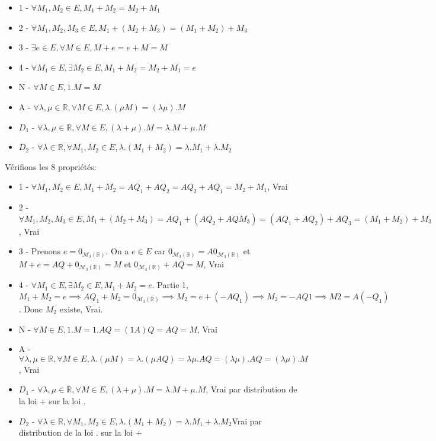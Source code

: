 \documentclass[]{book}
\theoremstyle{definition}
\newcommand{\bb}[1]{\mathbb{#1}}
\newcommand{\R}{\bb{R}}
\begin{document}
\begin{itemize}
\item 1 - $\forall M_1, M_2 \in E, M_1 + M_2 = M_2 + M_1$
\item 2 - $\forall M_1, M_2,M_3 \in E, M_1 + (M_2 + M_3)= (M_1 + M_2) + M_3$
\item 3 - $\exists e \in E, \forall M \in E, M+e=e+M=M$
\item 4 - $\forall M_1 \in E,\exists M_2 \in E, M_1 + M_2 = M_2 + M_1 = e$
\item N - $\forall M \in E, 1.M = M$
\item A - $\forall \lambda, \mu \in \R, \forall M \in E, \lambda.(\mu M) = (\lambda \mu).M$
\item $D_1$ - $\forall \lambda, \mu \in \R, \forall M \in E, (\lambda + \mu).M = \lambda.M + \mu.M$
\item $D_2$ - $\forall \lambda \in \R, \forall M_1, M_2 \in E, \lambda.(M_1+M_2) = \lambda.M_1 + \lambda.M_2$
\end{itemize}

V\'erifions les 8 propri\'et\'es:

 \begin{itemize}
\item 1 - $\forall M_1, M_2 \in E, M_1 + M_2 = AQ_1 + AQ_2 = AQ_2 + AQ_1 = M_2 + M_1$, Vrai
\item 2 - $\forall M_1, M_2,M_3 \in E, M_1 + (M_2 + M_3)= AQ_1 + (AQ_2 + AQM_3) =  (AQ_1 + AQ_2) + AQ_3= (M_1 + M_2) + M_3$, Vrai
\item 3 - Prenons $e = 0_{\mathcal{M}_3(\R)}$. On a $e \in E$ car $0_{\mathcal{M}_3(\R)} = A0_{\mathcal{M}_3(\R)}$ et $M+e=AQ+0_{\mathcal{M}_3(\R)}= M$ et $0_{\mathcal{M}_3(\R)}+AQ= M$, Vrai 
\item 4 - $\forall M_1 \in E,\exists M_2 \in E, M_1 + M_2 = e$. Partie 1, $M_1 + M_2 = e \implies AQ_1 + M_2 = 0_{\mathcal{M}_3(\R)} \implies M_2 = e + (-AQ_1) \implies M_2 = -AQ1 \implies M2 = A(-Q_1)$. Donc $M_2$ existe, Vrai. 
\item N - $\forall M \in E, 1.M = 1.AQ = (1A)Q = AQ = M$, Vrai 
\item A - $\forall \lambda, \mu \in \R, \forall M \in E, \lambda.(\mu M) = \lambda.(\mu AQ) = \lambda \mu.AQ = (\lambda \mu).AQ = (\lambda \mu).M$, Vrai
\item $D_1$ - $\forall \lambda, \mu \in \R, \forall M \in E, (\lambda + \mu).M = \lambda.M + \mu.M$, Vrai par distribution de la loi $+$ sur la loi $.$
\item $D_2$ - $\forall \lambda \in \R, \forall M_1, M_2 \in E, \lambda.(M_1+M_2) = \lambda.M_1 + \lambda.M_2$Vrai par distribution de la loi $.$ sur la loi $+$
\end{itemize}
\end{document}
